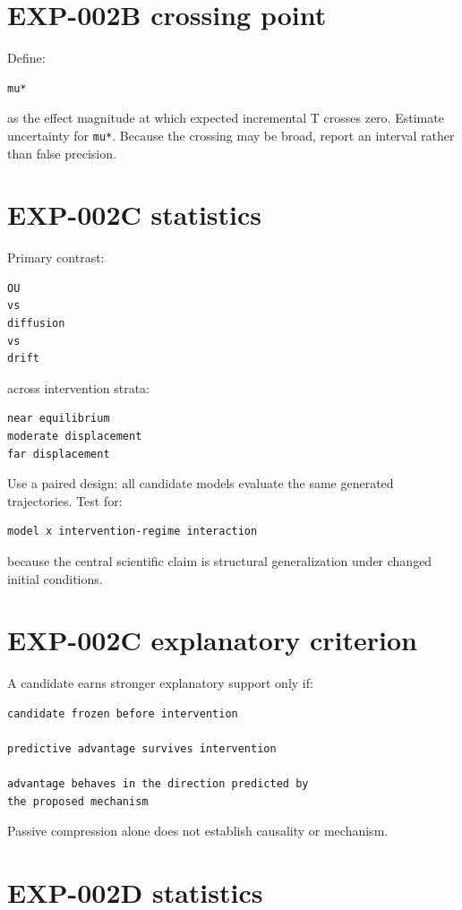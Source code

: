 \documentclass[11pt]{article}
\begin{document}
\section{EXP-002B crossing point}

Define:
\begin{verbatim}
mu*
\end{verbatim}
as the effect magnitude at which expected incremental T crosses zero. Estimate uncertainty for \texttt{mu*}. Because the crossing may be broad, report an interval rather than false precision.

\section{EXP-002C statistics}

Primary contrast:
\begin{verbatim}
OU
vs
diffusion
vs
drift
\end{verbatim}
across intervention strata:
\begin{verbatim}
near equilibrium
moderate displacement
far displacement
\end{verbatim}
Use a paired design: all candidate models evaluate the same generated trajectories. Test for:
\begin{verbatim}
model x intervention-regime interaction
\end{verbatim}
because the central scientific claim is structural generalization under changed initial conditions.

\section{EXP-002C explanatory criterion}

A candidate earns stronger explanatory support only if:
\begin{verbatim}
candidate frozen before intervention

predictive advantage survives intervention

advantage behaves in the direction predicted by
the proposed mechanism
\end{verbatim}
Passive compression alone does not establish causality or mechanism.

\section{EXP-002D statistics}
\end{document}
